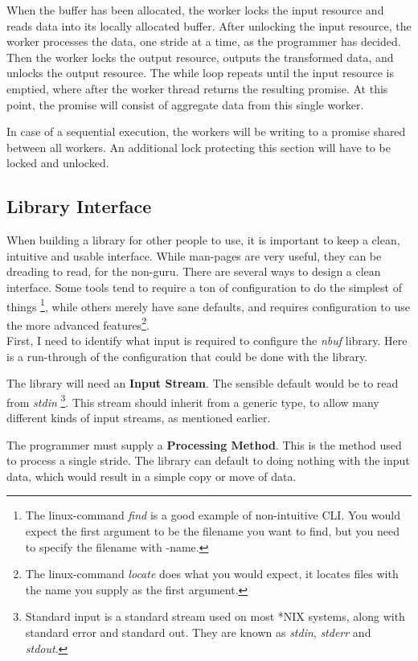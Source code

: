 \documentclass[a4paper]{article}
\newcommand{\nbuf}{\textit{nbuf} }
\begin{document}
When the buffer has been allocated, the worker locks the input resource and reads data into its locally allocated buffer. After unlocking the input resource, the worker processes the data, one stride at a time, as the programmer has decided. Then the worker locks the output resource, outputs the transformed data, and unlocks the output resource. The while loop repeats until the input resource is emptied, where after the worker thread returns the resulting promise. At this point, the promise will consist of aggregate data from this single worker.

In case of a sequential execution, the workers will be writing to a promise shared between all workers. An additional lock protecting this section will have to be locked and unlocked.

\newpage
\subsection{Library Interface}
When building a library for other people to use, it is important to keep a clean, intuitive and usable interface. While man-pages are very useful, they can be dreading to read, for the non-guru. There are several ways to design a clean interface. Some tools tend to require a ton of configuration to do the simplest of things \footnote{The linux-command \textit{find} is a good example of non-intuitive CLI. You would expect the first argument to be the filename you want to find, but you need to specify the filename with -name.}, while others merely have sane defaults, and requires configuration to use the more advanced features\footnote{The linux-command \textit{locate} does what you would expect, it locates files with the name you supply as the first argument.}.\\

First, I need to identify what input is required to configure the \nbuf library. Here is a run-through of the configuration that could be done with the library.

The library will need an \textbf{Input Stream}. The sensible default would be to read from \textit{stdin} \footnote{Standard input is a standard stream used on most *NIX systems, along with standard error and standard out. They are known as \textit{stdin}, \textit{stderr} and \textit{stdout}.}. This stream should inherit from a generic type, to allow many different kinds of input streams, as mentioned earlier.

The programmer must supply a \textbf{Processing Method}. This is the method used to process a single stride. The library can default to doing nothing with the input data, which would result in a simple copy or move of data.
\end{document}
